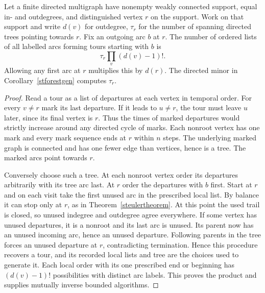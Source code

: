 \begin{corollary}\leavevmode\label{stbest}
Let a finite directed multigraph have nonempty weakly connected support, equal in- and outdegrees, and distinguished vertex $r$ on the support. Work on that support and write $d(v)$ for outdegree, $\tau_r$ for the number of spanning directed trees pointing towards $r$. Fix an outgoing arc $b$ at $r$. The number of ordered lists of all labelled arcs forming tours starting with $b$ is
\[
       \tau_r\prod_v (d(v)-1)! .
\]
Allowing any first arc at $r$ multiplies this by $d(r)$. The directed minor in Corollary~\ref{stforestgen} computes $\tau_r$.
\end{corollary}
\begin{proof}
Read a tour as a list of departures at each vertex in temporal order. For every $v\ne r$ mark its last departure. If it leads to $u\ne r$, the tour must leave $u$ later, since its final vertex is $r$. Thus the times of marked departures would strictly increase around any directed cycle of marks. Each nonroot vertex has one mark and every mark sequence ends at $r$ within $n$ steps. The underlying marked graph is connected and has one fewer edge than vertices, hence is a tree. The marked arcs point towards $r$.

Conversely choose such a tree. At each nonroot vertex order its departures arbitrarily with its tree arc last. At $r$ order the departures with $b$ first. Start at $r$ and on each visit take the first unused arc in the prescribed local list. By balance it can stop only at $r$, as in Theorem~\ref{steulertheorem}. At this point the used trail is closed, so unused indegree and outdegree agree everywhere. If some vertex has unused departures, it is a nonroot and its last arc is unused. Its parent now has an unused incoming arc, hence an unused departure. Following parents in the tree forces an unused departure at $r$, contradicting termination. Hence this procedure recovers a tour, and its recorded local lists and tree are the choices used to generate it. Each local order with its one prescribed end or beginning has $(d(v)-1)!$ possibilities with distinct arc labels. This proves the product and supplies mutually inverse bounded algorithms.
\end{proof}

